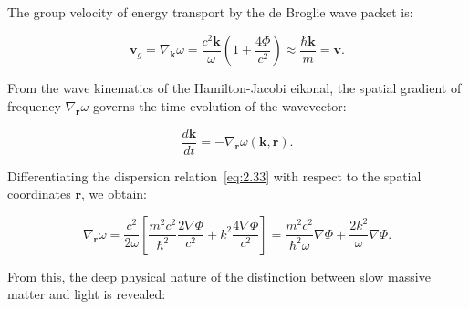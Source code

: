 \documentclass[11pt,a4paper]{article}
\theoremstyle{definition}
\begin{document}
The group velocity of energy transport by the de Broglie wave packet is:

\begin{equation}\label{eq:2.34}\tag{2.34}
\mathbf{v}_g = \nabla_{\mathbf{k}} \omega = \frac{c^2 \mathbf{k}}{\omega} \left( 1 + \frac{4\Phi}{c^2} \right) \approx \frac{\hbar \mathbf{k}}{m} = \mathbf{v}.
\end{equation}

From the wave kinematics of the Hamilton-Jacobi eikonal, the spatial gradient of frequency $\nabla_\mathbf{r} \omega$ governs the time evolution of the wavevector:

\begin{equation}\label{eq:2.35}\tag{2.35}
\frac{d\mathbf{k}}{dt} = -\nabla_{\mathbf{r}} \omega(\mathbf{k}, \mathbf{r}).
\end{equation}

Differentiating the dispersion relation~\eqref{eq:2.33} with respect to the spatial coordinates $\mathbf{r}$, we obtain:

\begin{equation}\label{eq:2.36}\tag{2.36}
\nabla_{\mathbf{r}}\omega = \frac{c^2}{2\omega} \left[ \frac{m^2 c^2}{\hbar^2} \frac{2\nabla\Phi}{c^2} + k^2 \frac{4\nabla\Phi}{c^2} \right] = \frac{m^2 c^2}{\hbar^2 \omega} \nabla\Phi + \frac{2 k^2}{\omega} \nabla\Phi.
\end{equation}

From this, the deep physical nature of the distinction between slow massive matter and light is revealed:
\end{document}
